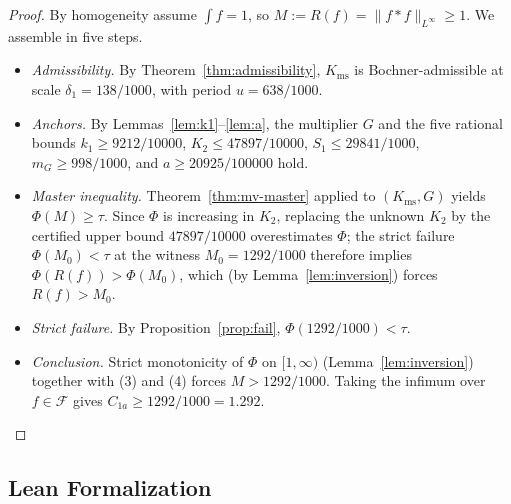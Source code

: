 \documentclass[11pt, letterpaper]{article}
\theoremstyle{paperplain}
\theoremstyle{paperdef}
\newcommand{\Linf}{L^\infty}
\newcommand{\Kms}{K_{\mathrm{ms}}}
\begin{document}
\begin{proof}
By homogeneity assume $\int f=1$, so $M:=R(f)=\|f*f\|_{\Linf}\ge 1$.
We assemble in five steps.
\begin{itemize}[leftmargin=2em]
\item[(1)] \emph{Admissibility.}  By Theorem~\ref{thm:admissibility},
$\Kms$ is Bochner-admissible at scale $\delta_1=138/1000$, with
period $u=638/1000$.
\item[(2)] \emph{Anchors.}  By Lemmas~\ref{lem:k1}--\ref{lem:a}, the
multiplier $G$ and the five rational bounds
$k_1\ge 9212/10000$, $K_2\le 47897/10000$, $S_1\le 29841/1000$,
$m_G\ge 998/1000$, and $a\ge 20925/100000$ hold.
\item[(3)] \emph{Master inequality.}  Theorem~\ref{thm:mv-master}
applied to $(\Kms,G)$ yields $\Phi(M)\ge \tau$.  Since $\Phi$ is
increasing in $K_2$, replacing the unknown $K_2$ by the certified
upper bound $47897/10000$ overestimates $\Phi$; the strict failure
$\Phi(M_0)<\tau$ at the witness $M_0=1292/1000$ therefore implies
$\Phi(R(f))>\Phi(M_0)$, which (by Lemma~\ref{lem:inversion}) forces
$R(f)>M_0$.
\item[(4)] \emph{Strict failure.}  By Proposition~\ref{prop:fail},
$\Phi(1292/1000)<\tau$.
\item[(5)] \emph{Conclusion.}  Strict monotonicity of $\Phi$ on
$[1,\infty)$ (Lemma~\ref{lem:inversion}) together with (3) and (4)
forces $M>1292/1000$.  Taking the infimum over $f\in\mathcal{F}$
gives $C_{1a}\ge 1292/1000=1.292$.\qedhere
\end{itemize}
\end{proof}

\subsection{Lean Formalization}\label{subsec:proof-lean}
\end{document}
